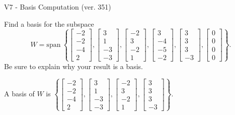 \begin{exercise}
  \begin{exerciseTitle}V7 - Basis Computation (ver. 351)\end{exerciseTitle}
  \begin{exerciseStatement}
    Find a basis for the subspace 
\[W=\mathrm{span}\ \left\{\left[\begin{array}{r}
-2 \\
-2 \\
-4 \\
2
\end{array}\right] , \left[\begin{array}{r}
3 \\
1 \\
-3 \\
-3
\end{array}\right] , \left[\begin{array}{r}
-2 \\
3 \\
-2 \\
1
\end{array}\right] , \left[\begin{array}{r}
3 \\
-4 \\
-5 \\
-2
\end{array}\right] , \left[\begin{array}{r}
3 \\
3 \\
3 \\
-3
\end{array}\right] , \left[\begin{array}{r}
0 \\
0 \\
0 \\
0
\end{array}\right]\right\}.\]
 Be sure to explain why your result is a basis.


  \end{exerciseStatement}
  \begin{exerciseAnswer}
   A basis of \(W\) is  \(\left\{\left[\begin{array}{r}
-2 \\
-2 \\
-4 \\
2
\end{array}\right] , \left[\begin{array}{r}
3 \\
1 \\
-3 \\
-3
\end{array}\right] , \left[\begin{array}{r}
-2 \\
3 \\
-2 \\
1
\end{array}\right] , \left[\begin{array}{r}
3 \\
3 \\
3 \\
-3
\end{array}\right]\right\}\).
  


  \end{exerciseAnswer}
\end{exercise}